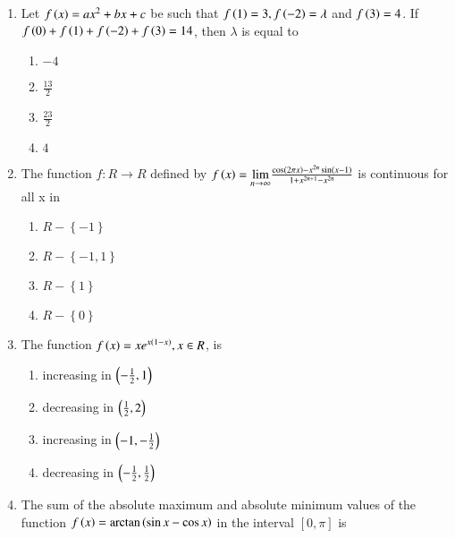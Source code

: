 \documentclass[journal]{IEEEtran}
\begin{document}
\begin{enumerate}
    \item Let $f\left(x\right)=ax^2+bx+c$ be such that $f\left(1\right)=3,f\left(-2\right)=\lambda$ and $f\left(3\right)=4$. If $f\left(0\right)+f\left(1\right)+f\left(-2\right)+f\left(3\right)=14$, then $\lambda$ is equal to 

		\begin{multicols}{4}
			\begin{enumerate}
				\item $-4$
				\item $\frac{13}{2}$
				\item $\frac{23}{2}$
				\item $4$
			\end{enumerate}
		\end{multicols}

    \item The function $f:R\to R$ defined by $f\left(x\right)=\underset{n\to\infty}{\lim}\frac{\cos\left(2\pi x\right)-x^{2n}\sin\left(x-1\right)}{1+x^{2n+1}-x^{2n}}$ is continuous for all x in

		\begin{multicols}{4}
			\begin{enumerate}
				\item $R-\left\{-1\right\}$
				\item $R-\left\{-1,1\right\}$
				\item $R-\left\{1\right\}$
				\item $R-\left\{0\right\}$
			\end{enumerate}
		\end{multicols}
  
    \item The function $f\left(x\right)=xe^{x\left(1-x\right)},x\in R$, is

        \begin{multicols}{2}
            \begin{enumerate}
                \item increasing in $\left(-\frac{1}{2},1\right)$
                \item decreasing in $\left(\frac{1}{2},2\right)$
                \item increasing in $\left(-1,-\frac{1}{2}\right)$
                \item decreasing in $\left(-\frac{1}{2},\frac{1}{2}\right)$
            \end{enumerate}
        \end{multicols}

    \item The sum of the absolute maximum and absolute minimum values of the function $f\left(x\right)=\arctan\left(\sin x-\cos x\right)$ in the interval $\left[0,\pi\right]$ is


\end{enumerate}
\end{document}
